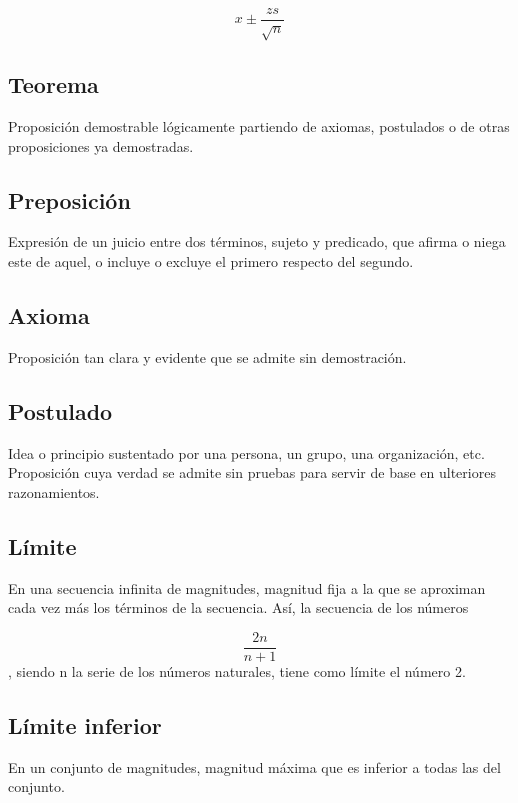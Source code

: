 \begin{equation}
    \label{eq1}
    x {\pm} {\frac{zs}{\sqrt{n}}}
\end{equation}

\subsection{Teorema}
Proposición demostrable lógicamente partiendo de axiomas, postulados o de otras proposiciones ya demostradas.\cite{RAE}

\subsection{Preposición}
Expresión de un juicio entre dos términos, sujeto y predicado, que afirma o niega este de aquel, o incluye o excluye el primero respecto del segundo. \cite{RAE}

\subsection{Axioma}
Proposición tan clara y evidente que se admite sin demostración.\cite{RAE}

\subsection{Postulado}
 Idea o principio sustentado por una persona, un grupo, una organización, etc. Proposición cuya verdad se admite sin pruebas para servir de base en ulteriores razonamientos.\cite{RAE}
 
\subsection{Límite}
 En una secuencia infinita de magnitudes, magnitud fija a la que se aproximan cada vez más los términos de la secuencia. Así, la secuencia de los números 
 
\begin{equation}
\label{eq1}
    {\frac{2n}{n+1}}
\end{equation}
, siendo n la serie de los números naturales, tiene como límite el número 2.\cite{RAE}


\subsection{Límite inferior}
En un conjunto de magnitudes, magnitud máxima que es inferior a todas las del conjunto.\cite{RAE}

